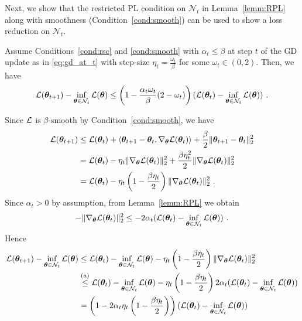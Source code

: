 Next, we show that the restricted PL condition on $\mathcal{N}_t$ in Lemma~\ref{lemm:RPL} along with smoothness (Condition~\ref{cond:smooth}) can be used to show a loss reduction on $\mathcal{N}_t$. 
%
\begin{lemm}
Assume Conditions~\ref{cond:rsc} and \ref{cond:smooth} with $\alpha_t \leq \beta$ at step $t$ of the GD update as in \eqref{eq:gd_at_t} with step-size $\eta_t=\frac{\omega_t}{\beta}$ for some $\omega_t \in(0,2)$.
Then, we have 
\begin{equation}
    {\mathcal{L}}({\bm{\theta}}_{t+1}) - \inf_{{\bm{\theta}} \in \mathcal{N}_t} {\mathcal{L}}({\bm{\theta}})  \leq \left(1-\frac{\alpha_t \omega_t}{\beta}(2-\omega_t) \right) ({\mathcal{L}}({\bm{\theta}}_t) - \inf_{{\bm{\theta}} \in \mathcal{N}_t} {\mathcal{L}}({\bm{\theta}}))~.
    \label{eq:conv-1_app}
\end{equation}
\label{lemm:local_loss}
\end{lemm}
%
\proof 
%
Since ${\mathcal{L}}$ is $\beta$-smooth by Condition~\ref{cond:smooth}, we have
\begin{equation}
    \label{eq:lemma2-aux}
\begin{aligned}
{\mathcal{L}}({\bm{\theta}}_{t+1}) & \leq {\mathcal{L}}({\bm{\theta}}_t) + \langle {\bm{\theta}}_{t+1} - {\bm{\theta}}_t, \nabla_{\bm{\theta}}{\mathcal{L}}({\bm{\theta}}_t) \rangle + \frac{\beta}{2}\| {\bm{\theta}}_{t+1} - {\bm{\theta}}_t \|_2^2 \\
& = {\mathcal{L}}({\bm{\theta}}_t) - \eta_t \| \nabla_{\bm{\theta}}{\mathcal{L}}({\bm{\theta}}_t) \|_2^2  + \frac{\beta \eta_t^2}{2} \| \nabla_{\bm{\theta}}{\mathcal{L}}({\bm{\theta}}_t) \|_2^2 \\
& = {\mathcal{L}}({\bm{\theta}}_t) - \eta_t \left(1 - \frac{\beta \eta_t}{2} \right) \| \nabla_{\bm{\theta}}{\mathcal{L}}({\bm{\theta}}_t) \|_2^2~.
\end{aligned}
\end{equation}
Since $\alpha_t>0$ by assumption, from Lemma~\ref{lemm:RPL} we obtain
\begin{align*}
    - \| \nabla_{\bm{\theta}}{\mathcal{L}}({\bm{\theta}}_t) \|_2^2 \leq - 2\alpha_t ({\mathcal{L}}({\bm{\theta}}_t) - \inf_{{\bm{\theta}} \in \mathcal{N}_t} {\mathcal{L}}({\bm{\theta}}) )~.
\end{align*}
Hence
\begin{align*}
{\mathcal{L}}({\bm{\theta}}_{t+1}) - \inf_{{\bm{\theta}} \in \mathcal{N}_t} {\mathcal{L}}({\bm{\theta}}) & \leq {\mathcal{L}}({\bm{\theta}}_t) - \inf_{{\bm{\theta}} \in \mathcal{N}_t} {\mathcal{L}}({\bm{\theta}})  - \eta_t \left(1 - \frac{\beta \eta_t}{2} \right) \| \nabla_{\bm{\theta}}{\mathcal{L}}({\bm{\theta}}_t) \|_2^2  \\
& \overset{(a)}{\leq} {\mathcal{L}}({\bm{\theta}}_t) - \inf_{{\bm{\theta}} \in \mathcal{N}_t} {\mathcal{L}}({\bm{\theta}}) - 
\eta_t \left(1 - \frac{\beta \eta_t}{2} \right)2\alpha_t({\mathcal{L}}({\bm{\theta}}_t) - \inf_{{\bm{\theta}} \in \mathcal{N}_t} {\mathcal{L}}({\bm{\theta}})) \\
& = \left(1 - 
2\alpha_t\eta_t \left(1 - \frac{\beta \eta_t}{2} \right)
\right) ({\mathcal{L}}({\bm{\theta}}_t) - \inf_{{\bm{\theta}} \in \mathcal{N}_t} {\mathcal{L}}({\bm{\theta}}))
\end{align*}

